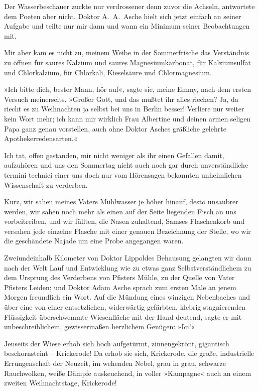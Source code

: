 Der Wasserbeschauer zuckte nur verdrossener denn zuvor die Achseln,
antwortete dem Poeten aber nicht. Doktor A.~A.~Asche hielt sich
jetzt einfach an seiner Aufgabe und teilte nur mir dann und wann
ein Minimum seiner Beobachtungen mit.

Mir aber kam es nicht zu, meinem Weibe in der Sommerfrische das
Verständnis zu öffnen für saures Kalzium und saures
Magnesiumkarbonat, für Kalziumsulfat und Chlorkalzium, für
Chlorkali, Kieselsäure und Chlormagnesium.

»Ich bitte dich, bester Mann, hör auf«, sagte sie, meine Emmy, nach
dem ersten Versuch meinerseits. »Großer Gott, und das mußtet ihr
alles riechen? Ja, da riecht es zu Weihnachten ja selbst bei uns in
Berlin besser! Verliere nur weiter kein Wort mehr; ich kann mir
wirklich Frau Albertine und deinen armen seligen Papa ganz genau
vorstellen, auch ohne Doktor Asches gräßliche gelehrte
Apothekerredensarten.«

Ich tat, offen gestanden, mir nicht weniger als ihr einen Gefallen
damit, aufzuhören und uns den Sommertag nicht auch noch gar durch
unverständliche termini technici einer uns doch nur vom Hörensagen
bekannten unheimlichen Wissenschaft zu verderben.

Kurz, wir sahen meines Vaters Mühlwasser je höher hinauf, desto
unsaubrer werden, wir sahen noch mehr als einen auf der Seite
liegenden Fisch an uns vorbeitreiben, und wir füllten, die Nasen
zuhaltend, Samses Flaschenkorb und versahen jede einzelne Flasche
mit einer genauen Bezeichnung der Stelle, wo wir die geschändete
Najade um eine Probe angegangen waren.

Zweiundeinhalb Kilometer von Doktor Lippoldes Behausung gelangten
wir dann nach der Welt Lauf und Entwicklung wie zu etwas ganz
Selbstverständlichem zu dem Ursprung des Verderbens von Pfisters
Mühle, zu der Quelle von Vater Pfisters Leiden; und Doktor Adam
Asche sprach zum ersten Male an jenem Morgen freundlich ein Wort.
Auf die Mündung eines winzigen Nebenbaches und über eine von einer
entsetzlichen, widerwärtig gefärbten, klebrig stagnierenden
Flüssigkeit überschwemmte Wiesenfläche mit der Hand deutend, sagte
er mit unbeschreiblichem, gewissermaßen herzlichem Genügen: »Ici!«

Jenseits der Wiese erhob sich hoch aufgetürmt, zinnengekrönt,
gigantisch beschornsteint – Krickerode! Da erhob sie sich,
Krickerode, die große, industrielle Errungenschaft der Neuzeit, im
wehenden Nebel, grau in grau, schwarze Rauchwolken, weiße Dämpfe
auskeuchend, in voller »Kampagne« auch an einem zweiten
Weihnachtstage, Krickerode!


